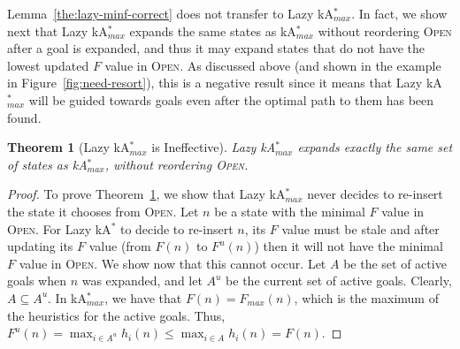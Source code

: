\documentclass{aicom2e}
\newtheorem{theorem}{Theorem}
\newcommand{\kastar}{kA$^*$}
\newcommand{\kastarmin}{kA$^*_{min}$}
\newcommand{\kastarmax}{kA$^*_{max}$}
\newcommand{\maxf}{$F_{max}(n)$}
\newcommand{\open}{\textsc{Open}}
\begin{document}
Lemma~\ref{the:lazy-minf-correct} does not transfer to Lazy \kastarmax{}.
In fact, we show next that Lazy \kastarmax{} expands
the same states as \kastarmax{} without reordering \open{} after a goal is expanded,
and thus it may expand states that do not have the lowest updated $F$ value in \open{}.
As discussed above (and shown in the example in Figure~\ref{fig:need-resort}), this is a negative
result since it means that Lazy \kastarmax{} will be guided towards goals even
after the optimal path to them has been found.
\begin{theorem}[Lazy \kastarmax{} is Ineffective]
Lazy \kastarmax{} expands exactly the same set of states as \kastarmax{},
without reordering \open{}.
    \label{the:lazy-maxf-bad}
\end{theorem}
\begin{proof}
    To prove Theorem~\ref{the:lazy-maxf-bad}, we show that Lazy \kastarmax{} never decides to re-insert the state it chooses from \open{}. Let $n$ be a state with the minimal $F$ value in \open.
    For Lazy \kastar{} to decide to re-insert $n$,  its $F$ value must be stale and after updating its $F$ value
    (from $F(n)$ to $F^u(n)$) then it will not have  the minimal $F$ value in \open{}.
    We show now that this cannot occur. %
    Let $A$ be the set of active goals when
    $n$ was expanded, and let $A^u$ be the current set of active goals. Clearly, $A\subseteq A^u$.
    In \kastarmax{}, we have that $F(n)=$\maxf{}, which is the maximum of the heuristics for the active goals.
    Thus, $F^u(n)=\max_{i\in A^u} h_i(n)\leq \max_{i\in A} h_i(n) = F(n)$.
\end{proof}
\end{document}
